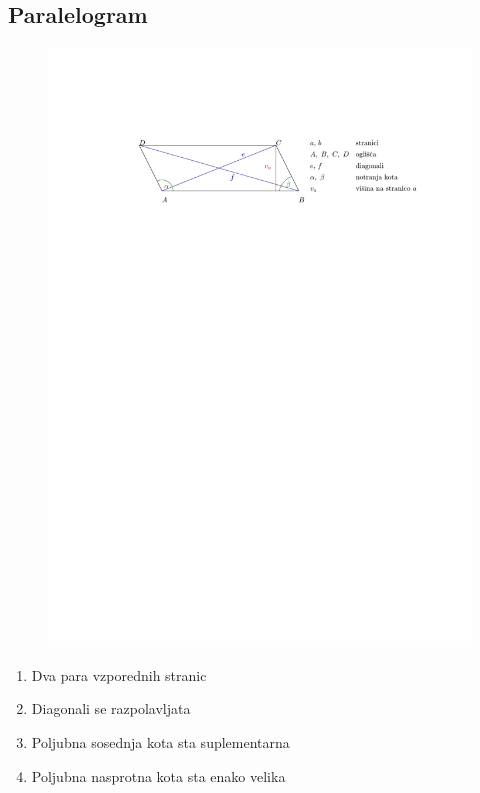 \documentclass{article}
\begin{document}
\subsection*{Paralelogram}

\begin{figure}[H]
    \includegraphics[width=1\textwidth]{paralelogram.pdf}
    \centering
\end{figure}

\begin{enumerate}[i]
    \item Dva para vzporednih stranic
    \item Diagonali se razpolavljata
    \item Poljubna sosednja kota sta suplementarna
    \item Poljubna nasprotna kota sta enako velika
  \end{enumerate}
\end{document}
